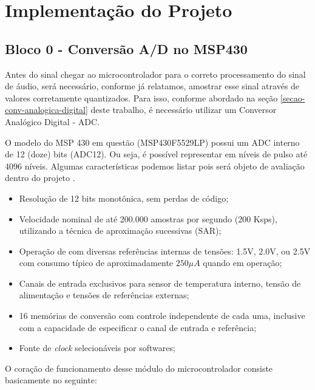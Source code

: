 \chapter{Implementação do Projeto}

\section{Bloco 0 - Conversão A/D no MSP430}
	
	Antes do sinal chegar ao microcontrolador para o correto processamento do sinal de áudio, será necessário, conforme já relatamos, amostrar esse sinal através de valores corretamente quantizados. Para isso, conforme abordado na seção \ref{secao-conv-analogica-digital} deste trabalho, é necessário utilizar um Conversor Analógico Digital - ADC.
	
	O modelo do MSP 430 em questão (MSP430F5529LP) possui um ADC interno de 12 (doze) bits (ADC12). Ou seja, é possível representar em níveis de pulso até 4096 níveis. Algumas características podemos listar pois será objeto de avaliação dentro do projeto \cite{Davies2008}.
	
	\begin{itemize}
		\item Resolução de 12 bits monotônica, sem perdas de código;
		\item Velocidade nominal de até 200.000 amostras por segundo (200 Ksps), utilizando a técnica de aproximação sucessivas (SAR);
		\item Operação de com diversas referências internas de tensões: 1.5V, 2.0V, ou 2.5V com consumo típico de aproximadamente $250\mu A$ quando em operação;
		\item Canais de entrada exclusivos para sensor de temperatura interno, tensão de alimentação e tensões de referências externas;
		\item 16 memórias de conversão com controle independente de cada uma, inclusive com a capacidade de especificar o canal de entrada e referência;
		\item Fonte de \textit{clock} selecionáveis por softwares;
	\end{itemize}

	O coração de funcionamento desse módulo do microcontrolador consiste basicamente no seguinte:
	
